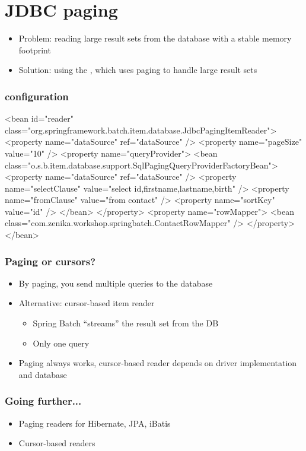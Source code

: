 \section{JDBC paging}

\begin{frame}
 \begin{itemize}
  \item Problem: reading large result sets from the database with a stable memory footprint 
  \item Solution: using the , which uses paging to handle large result sets
 \end{itemize}
\end{frame}


\begin{frame}[fragile]
\frametitle{ configuration}

\lstset{language=XML}
\begin{xmlcode}
<bean id="reader"
      class="org.springframework.batch.item.database.JdbcPagingItemReader">
  <property name="dataSource" ref="dataSource" />
  <property name="pageSize" value="10" />
  <property name="queryProvider">
    <bean class="o.s.b.item.database.support.SqlPagingQueryProviderFactoryBean">
      <property name="dataSource" ref="dataSource" />
      <property name="selectClause" 
                value="select id,firstname,lastname,birth" />
      <property name="fromClause" value="from contact" />
      <property name="sortKey" value="id" />
    </bean>
  </property>
  <property name="rowMapper">
    <bean class="com.zenika.workshop.springbatch.ContactRowMapper" />
  </property>
</bean>
\end{xmlcode}
\end{frame}

\begin{frame}
\frametitle{Paging or cursors?}
\begin{itemize}
 \item By paging, you send multiple queries to the database
 \item Alternative: cursor-based item reader
 \begin{itemize}
  \item Spring Batch “streams” the result set from the DB
  \item Only one query
 \end{itemize}
 \item Paging always works, cursor-based reader depends on driver implementation and database
\end{itemize}
\end{frame}

\begin{frame}
 \frametitle{Going further...}
 \begin{itemize}
  \item Paging readers for Hibernate, JPA, iBatis
  \item Cursor-based readers
 \end{itemize}
\end{frame}

